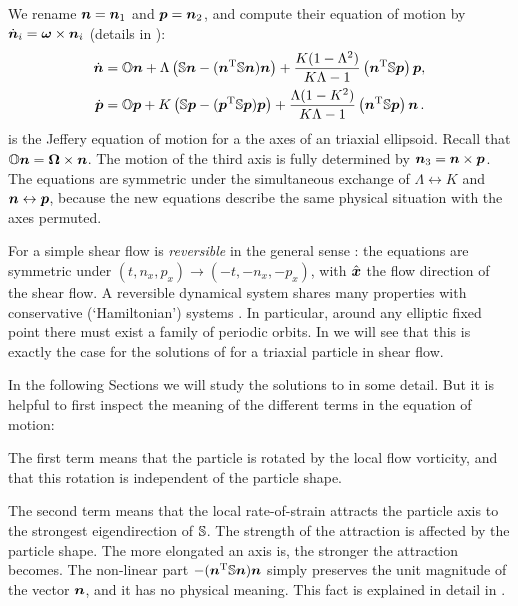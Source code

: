 \documentclass[thesis.tex]{subfiles}
\begin{document}
We rename $\mbox{\boldmath$n$} = \mbox{\boldmath$n$}_1$ and $\mbox{\boldmath$p$}=\mbox{\boldmath$n$}_2$, and compute their equation of motion by $\dot{\mbox{\boldmath$n$}}_i=\mbox{\boldmath$\omega$} \times \mbox{\boldmath$n$}_i$ (details in ):
\begin{align}
	\dot{\ve n}	&= \ma O \ve n 
	+ \Lambda\left(
	\ma S \ve n - (\ve n \transpose \ma S \ve n) \ve n
	\right)
    + \frac{K(1- \Lambda^2)}{K \Lambda - 1}\left(\ve n\transpose \ma S\ve p\right)\ve p,  \nn\\
\dot{\ve p}	&=    \ma O \ve p
	 + K\left(
\ma S \ve p  - (\ve p \transpose \ma S \ve p) \ve p
	 \right)
	  + \frac{\Lambda(1-K^2)}{K \Lambda - 1}\left(\ve n\transpose \ma S\ve p\right)\ve n\,. \eqnlab{np}
\end{align}
 is the Jeffery equation of motion for a the axes of an triaxial ellipsoid. Recall that $\mathbb{O} \mbox{\boldmath$n$}=\mbox{\boldmath$\Omega$} \times \mbox{\boldmath$n$}$. The motion of the third axis is fully determined by $\mbox{\boldmath$n$}_3 = \mbox{\boldmath$n$} \times \mbox{\boldmath$p$}$. The equations are symmetric under the simultaneous exchange of $\Lambda\leftrightarrow K$ and $\mbox{\boldmath$n$}\leftrightarrow\mbox{\boldmath$p$}$, because the new equations describe the same physical situation with the axes permuted.

For a simple shear flow  is \emph{reversible} in the general sense \cite{lamb1998}: the equations are symmetric under $(t,n_x,p_x)\to(-t, -n_x, -p_x)$, with $\hat{\mbox{\boldmath$x$}}$ the flow direction of the shear flow. A reversible dynamical system shares many properties with conservative (\lq Hamiltonian\rq) systems \cite{lamb1998}. In particular, around any elliptic fixed point there must exist a family of periodic orbits. In  we will see that this is exactly the case for the solutions of  for a triaxial particle in shear flow.

In the following Sections we will study the solutions to  in some detail. But it is helpful to first inspect the meaning of the different terms in the equation of motion:

The first term means that the particle is rotated by the local flow vorticity, and that this rotation is independent of the particle shape.

The second term means that the local rate-of-strain attracts the particle axis to the strongest eigendirection of $\mathbb{S}$. The strength of the attraction is affected by the particle shape. The more elongated an axis is, the stronger the attraction becomes. The non-linear part $- (\mbox{\boldmath$n$} ^{\mathrm T} \mathbb{S} \mbox{\boldmath$n$}) \mbox{\boldmath$n$}$ simply preserves the unit magnitude of the vector $\mbox{\boldmath$n$}$, and it has no physical meaning. This fact is explained in detail in . 
\end{document}
